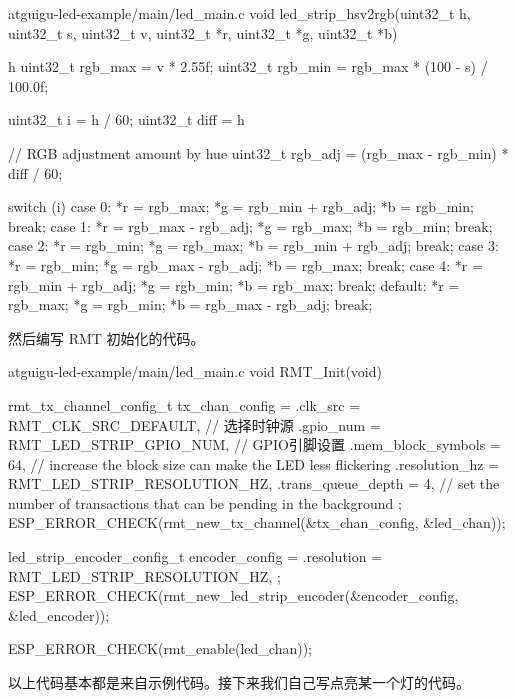 \documentclass[lang=cn,newtx,10pt,scheme=chinese]{elegantbook}
\begin{document}
\begin{mycode}{atguigu-led-example/main/led\_main.c}
void led_strip_hsv2rgb(uint32_t h, uint32_t s, uint32_t v, uint32_t *r, uint32_t *g, uint32_t *b)
{
    h %
    uint32_t rgb_max = v * 2.55f;
    uint32_t rgb_min = rgb_max * (100 - s) / 100.0f;

    uint32_t i = h / 60;
    uint32_t diff = h %

    // RGB adjustment amount by hue
    uint32_t rgb_adj = (rgb_max - rgb_min) * diff / 60;

    switch (i)
    {
    case 0:
        *r = rgb_max;
        *g = rgb_min + rgb_adj;
        *b = rgb_min;
        break;
    case 1:
        *r = rgb_max - rgb_adj;
        *g = rgb_max;
        *b = rgb_min;
        break;
    case 2:
        *r = rgb_min;
        *g = rgb_max;
        *b = rgb_min + rgb_adj;
        break;
    case 3:
        *r = rgb_min;
        *g = rgb_max - rgb_adj;
        *b = rgb_max;
        break;
    case 4:
        *r = rgb_min + rgb_adj;
        *g = rgb_min;
        *b = rgb_max;
        break;
    default:
        *r = rgb_max;
        *g = rgb_min;
        *b = rgb_max - rgb_adj;
        break;
    }
}
\end{mycode}

然后编写 RMT 初始化的代码。

\begin{mycode}{atguigu-led-example/main/led\_main.c}
void RMT_Init(void)
{
    rmt_tx_channel_config_t tx_chan_config = {
        .clk_src = RMT_CLK_SRC_DEFAULT, // 选择时钟源
        .gpio_num = RMT_LED_STRIP_GPIO_NUM, // GPIO引脚设置
        .mem_block_symbols = 64, // increase the block size can make the LED less flickering
        .resolution_hz = RMT_LED_STRIP_RESOLUTION_HZ,
        .trans_queue_depth = 4, // set the number of transactions that can be pending in the background
    };
    ESP_ERROR_CHECK(rmt_new_tx_channel(&tx_chan_config, &led_chan));

    led_strip_encoder_config_t encoder_config = {
        .resolution = RMT_LED_STRIP_RESOLUTION_HZ,
    };
    ESP_ERROR_CHECK(rmt_new_led_strip_encoder(&encoder_config, &led_encoder));

    ESP_ERROR_CHECK(rmt_enable(led_chan));
}
\end{mycode}

以上代码基本都是来自示例代码。接下来我们自己写点亮某一个灯的代码。
\end{document}
